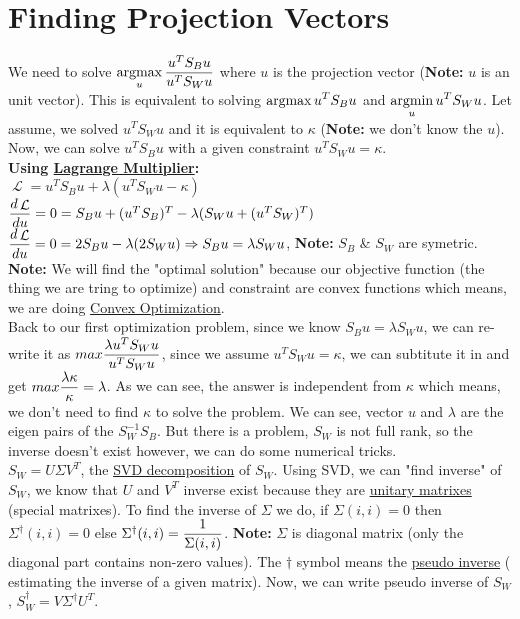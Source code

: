 \documentclass{article}
\DeclareMathOperator*{\argmax}{argmax}
\DeclareMathOperator*{\argmin}{argmin}
\DeclareMathOperator*{\lagrange}{\mathcal{L}}
\begin{document}
\section*{Finding Projection Vectors}
We need to solve $\mathlarger{\argmax_u \frac{u^T S_B u}{u^T S_W u}}$ where $u$ is the projection vector ({\bfseries{Note:}} $u$ is an unit vector).
This is equivalent to solving $\mathlarger{\argmax u^T S_B u}$ and $\mathlarger{\argmin_u u^T S_W u}$.
Let assume, we solved $ u^T S_W u$ and it is equivalent to $\kappa$ ({\bfseries{Note:}} we don't know the $u$).
Now, we can solve $u^T S_B u$ with a given constraint $ u^T S_W u = \kappa$.\\
{\bfseries{Using \href{https://en.wikipedia.org/wiki/Lagrange_multiplier}{Lagrange Multiplier}:}}\\
$\lagrange = u^T S_B u + \lambda (u^T S_W u - \kappa) $\\
$\mathlarger{\frac{d\lagrange}{du}} = 0 = S_Bu + (u^TS_B)^T-  \lambda(S_Wu + (u^TS_W)^T)$\\
$\mathlarger{\frac{d\lagrange}{du}} = 0 = 2S_Bu -  \lambda(2S_Wu) \Rightarrow S_B u = \lambda S_W u$, {\bfseries{ Note:}} $S_B$ \& $S_W$ are symetric.\\
{\bfseries{Note:}} We will find the "optimal solution" because our objective function (the thing we are tring to optimize) and constraint are convex functions which means, we are doing \href{https://en.wikipedia.org/wiki/Convex_optimization}{Convex Optimization}.\\
Back to our first optimization problem, since we know $S_B u = \lambda S_W u$, we can re-write it as $\mathlarger{max \frac{\lambda u^T S_W u}{u^T S_W u}}$, since we assume $ u^T S_W u = \kappa$, we can subtitute it in and get $\mathlarger{max \frac{\lambda \kappa}{\kappa}} = \lambda$. As we can see, the answer is independent from $\kappa$ which means, we don't need to find $\kappa$ to solve the problem. We can see, vector $u$ and $\lambda$ are the eigen pairs of the $S_W^{-1} S_B$. But there is a problem, $S_W$ is not full rank, so the inverse doesn't exist however, we can do some numerical tricks.\\
$S_W = U \Sigma V^T$, the \href{https://en.wikipedia.org/wiki/Singular-value_decomposition}{SVD decomposition} of $S_W$. Using SVD, we can "find inverse" of $S_W$, we know that $U$ and $V^T$ inverse exist because they are \href{https://en.wikipedia.org/wiki/Unitary_matrix}{unitary matrixes} (special matrixes). To find the inverse of $\Sigma$ we do, if $\Sigma(i,i) = 0$ then $\Sigma^\dagger(i,i) = 0$ else $\Sigma^\dagger(i,i) = \mathlarger{\frac{1}{\Sigma(i,i)}}$. {\bfseries{Note:}} $\Sigma$ is diagonal matrix (only the diagonal part contains non-zero values). The $\dagger$ symbol means the \href{https://en.wikipedia.org/wiki/Moore}{pseudo inverse} ( estimating the inverse of a given matrix). Now, we can write pseudo inverse of $S_W$, $S_W^\dagger = V \Sigma^\dagger U^T$.\\
\end{document}
